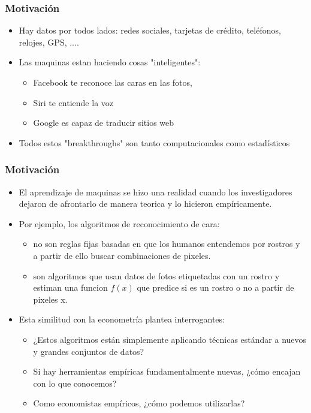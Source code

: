 \documentclass[
  shownotes,
  xcolor={svgnames},
  hyperref={colorlinks,citecolor=DarkBlue,linkcolor=DarkRed,urlcolor=DarkBlue}
  ]{beamer}
\begin{document}
\begin{frame}
\frametitle{Motivación}

\begin{itemize}
      \item  Hay datos por todos lados: redes sociales, tarjetas de crédito, teléfonos, relojes, GPS, ....
      \bigskip
      \item  Las maquinas estan haciendo cosas "inteligentes":
      \begin{itemize}
        \item Facebook te reconoce las caras en las fotos,
        \item Siri te entiende la voz
        \item Google es capaz de traducir sitios web
      \end{itemize}
  \bigskip
  \item Todos estos "breakthroughs" son tanto computacionales como estadísticos
  \bigskip
\end{itemize}


\end{frame}


\begin{frame}
\frametitle{Motivación}

\begin{itemize}
      \item El aprendizaje de maquinas se hizo una realidad cuando los investigadores dejaron de afrontarlo de manera teorica y lo hicieron empíricamente.
      \item Por ejemplo, los algoritmos de reconocimiento de cara: 
      \medskip
      \begin{itemize}
        \item no son reglas fijas basadas en que los humanos entendemos por rostros y a partir de ello buscar combinaciones de pixeles.
        \item son algoritmos que usan datos de fotos etiquetadas con un rostro y estiman una funcion $f(x)$ que predice si es un rostro o no a partir de pixeles x.
      \end{itemize}
      \medskip
      \item  Esta similitud con la econometría plantea interrogantes:
      \begin{itemize}
      \item  ¿Estos algoritmos están simplemente aplicando técnicas estándar a nuevos y grandes conjuntos de datos? 
      \item  Si hay herramientas empíricas fundamentalmente nuevas, ¿cómo encajan con lo que conocemos? 
      \item  Como economistas empíricos, ¿cómo podemos utilizarlas?
       \end{itemize}
\end{itemize}

\end{frame}
\end{document}
